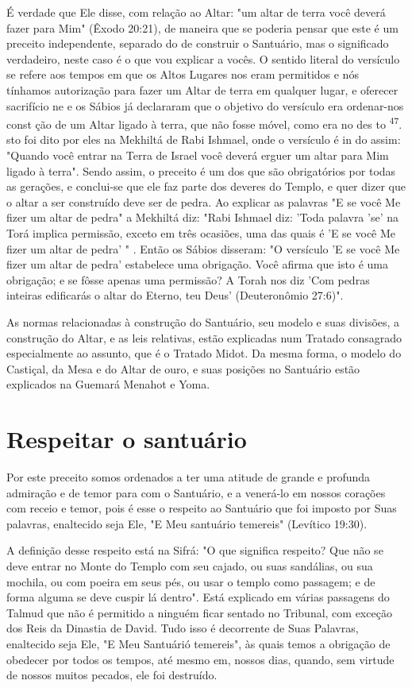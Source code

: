 \begin{itemize}
\begin{enumrate}
\begin{itemize}
\begin{itemize}
É verdade que Ele disse, com relação ao Altar: "um altar de terra vo­cê
deverá fazer para Mim" (Êxodo 20:21), de maneira que se poderia pensar
que este é um preceito independente, separado do de construir o
Santuário, mas o significado verdadeiro, neste caso é o que vou explicar
a vocês. O senti­do literal do versículo se refere aos tempos em que os
Altos Lugares nos eram permitidos e nós tínhamos autorização para fazer
um Altar de terra em qual­quer lugar, e oferecer sacrifício ne e os
Sábios já declararam que o objetivo do versículo era ordenar-nos const
ção de um Altar ligado à terra, que não fosse móvel, como era no des to
\textsuperscript{47}. sto foi dito por eles na Mekhiltá de Rabi Ishmael,
onde o versículo é in do assim: "Quando você entrar na Terra de Israel
você deverá erguer um altar para Mim ligado à terra". Sendo assim, o
preceito é um dos que são obrigatórios por todas as gerações, e
conclui-se que ele faz parte dos deveres do Templo, e quer dizer que o
altar a ser construí­do deve ser de pedra. Ao explicar as palavras "E se
você Me fizer um altar de pedra" a Mekhiltá diz: "Rabi Ishmael diz:
'Toda palavra 'se' na Torá implica permissão, exceto em três ocasiões,
uma das quais é 'E se você Me fizer um altar de pedra' " . Então os
Sábios disseram: "O versículo 'E se você Me fizer um altar de pedra'
estabelece uma obrigação. Você afirma que isto é uma obri­gação; e se
fôsse apenas uma permissão? A Torah nos diz 'Com pedras inteiras
edificarás o altar do Eterno, teu Deus' (Deuteronômio 27:6)".

As normas relacionadas à construção do Santuário, seu modelo e suas
divisões, a construção do Altar, e as leis relativas, estão explicadas
num Trata­do consagrado especialmente ao assunto, que é o Tratado Midot.
Da mesma forma, o modelo do Castiçal, da Mesa e do Altar de ouro, e suas
posições no Santuário estão explicados na Guemará Menahot e Yoma.

\section{Respeitar o santuário}

Por este preceito somos ordenados a ter uma atitude de grande e profunda
admiração e de temor para com o Santuário, e a venerá-lo em nossos
corações com receio e temor, pois é esse o respeito ao Santuário que foi
im­posto por Suas palavras, enaltecido seja Ele, "E Meu santuário
temereis" (Leví­tico 19:30).

A definição desse respeito está na Sifrá: "O que significa respeito? Que
não se deve entrar no Monte do Templo com seu cajado, ou suas
sandá­lias, ou sua mochila, ou com poeira em seus pés, ou usar o templo
como passa­gem; e de forma alguma se deve cuspir lá dentro". Está
explicado em várias passagens do Talmud que não é permitido a ninguém
ficar sentado no Tribu­nal, com exceção dos Reis da Dinastia de David.
Tudo isso é decorrente de Suas Palavras, enaltecido seja Ele, "E Meu
Santuárió temereis", às quais temos a obri­gação de obedecer por todos
os tempos, até mesmo em, nossos dias, quando, sem virtude de nossos
muitos pecados, ele foi destruído.


\end{itemize}
\end{itemize}
\end{enumrate}
\end{itemize}
